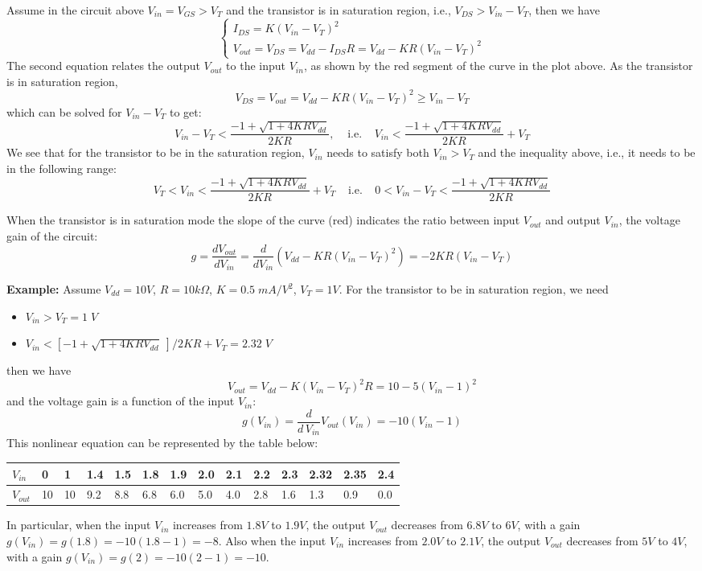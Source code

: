 \begin{itemize}
Assume in the circuit above $V_{in}=V_{GS}>V_T$ and the transistor is in 
saturation region, i.e., $V_{DS}>V_{in}-V_T$, then we have 
\[ 
\left\{ \begin{array}{l}
I_{DS}=K(V_{in}-V_T)^2 \\
V_{out}=V_{DS}=V_{dd}-I_{DS} R=V_{dd}-KR(V_{in}-V_T)^2  \end{array} \right.
\]
The second equation relates the output $V_{out}$ to the input $V_{in}$, as
shown by the red segment of the curve in the plot above. As the transistor is 
in saturation region,
\[ 
V_{DS}=V_{out}=V_{dd}-KR(V_{in}-V_T)^2\ge V_{in}-V_T 
\]
which can be solved for $V_{in}-V_T$ to get:
\[
V_{in}-V_T <\frac{-1+\sqrt{1+4KRV_{dd}}}{2KR},\;\;\;\;\mbox{i.e.}\;\;\;\;
V_{in}<\frac{-1+\sqrt{1+4KRV_{dd}}}{2KR}+V_T 
\]
We see that for the transistor to be in the saturation region, $V_{in}$
needs to satisfy both $V_{in}>V_T$ and the inequality above, i.e., it 
needs to be in the following range:
\[
V_T<V_{in}<\frac{-1+\sqrt{1+4KRV_{dd}}}{2KR}+V_T 
\;\;\;\;\mbox{i.e.}\;\;\;\;
0<V_{in}-V_T <\frac{-1+\sqrt{1+4KRV_{dd}}}{2KR}
\]

When the transistor is in saturation mode the slope of the curve (red) 
indicates the ratio between input $V_{out}$ and output $V_{in}$, the voltage
gain of the circuit:
\[
g=\frac{d V_{out}}{d V_{in}}=\frac{d}{d V_{in}}(V_{dd}-KR(V_{in}-V_T)^2 )
=-2KR(V_{in}-V_T) 
\]

{\bf Example:} Assume $V_{dd}=10V$, $R=10 k\Omega$, $K=0.5\;mA/V^2$, $V_T=1V$.
For the transistor to be in saturation region, we need
\begin{itemize}
\item $V_{in}>V_T=1\;V$ 
\item $V_{in}<[-1+\sqrt{1+4KRV_{dd}}\;]/2KR+V_T=2.32\;V $
\end{itemize}
then we have
\[
V_{out}=V_{dd}-K(V_{in}-V_T)^2 R=10-5(V_{in}-1)^2 
\]
and the voltage gain is a function of the input $V_{in}$:
\[ g(V_{in})=\frac{d}{d\,V_{in}} V_{out}(V_{in})=-10(V_{in}-1) \]
This nonlinear equation can be represented by the table below:
\begin{tabular}{l | lllllllllllll} 
$V_{in} $ & 0  & 1  & 1.4 & 1.5 & 1.8 & 1.9 & 2.0 & 2.1 & 2.2 & 2.3 & 2.32 & 2.35 & 2.4 \\ \hline
$V_{out}$ & 10 & 10 & 9.2 & 8.8 & 6.8 & 6.0 & 5.0 & 4.0 & 2.8 & 1.6 & 1.3  & 0.9  & 0.0 
\end{tabular}
In particular, when the input $V_{in}$ increases from $1.8V$ to $1.9V$, the output 
$V_{out}$ decreases from $6.8V$ to $6V$, with a gain $g(V_{in})=g(1.8)=-10(1.8-1)=-8$.
Also when the input $V_{in}$ increases from $2.0V$ to $2.1V$, the output $V_{out}$ 
decreases from $5V$ to $4V$, with a gain $g(V_{in})=g(2)=-10(2-1)=-10$. 


\end{itemize}
